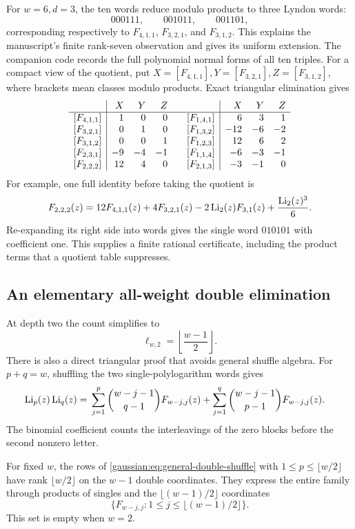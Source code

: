 For \(w=6,d=3\), the ten words reduce modulo products to three Lyndon
words:
\[
000111,\qquad001011,\qquad001101,
\]
corresponding respectively to \(F_{4,1,1}\), \(F_{3,2,1}\),
and \(F_{3,1,2}\). This explains the manuscript's finite rank-seven
observation and gives its uniform extension.
The companion code records the full polynomial normal forms of all ten
triples. For a compact view of the quotient, put
\(X=[F_{4,1,1}],Y=[F_{3,2,1}],Z=[F_{3,1,2}]\), where brackets mean
classes modulo products. Exact triangular elimination gives
\[
\begin{array}{c|rrr@{\qquad}c|rrr}
 &X&Y&Z&&X&Y&Z\\ \hline
{}[F_{4,1,1}]&1&0&0 &[F_{1,4,1}]&6&3&1\\
{}[F_{3,2,1}]&0&1&0 &[F_{1,3,2}]&-12&-6&-2\\
{}[F_{3,1,2}]&0&0&1 &[F_{1,2,3}]&12&6&2\\
{}[F_{2,3,1}]&-9&-4&-1 &[F_{1,1,4}]&-6&-3&-1\\
{}[F_{2,2,2}]&12&4&0 &[F_{2,1,3}]&-3&-1&0
\end{array}
\]
For example, one full identity before taking the quotient is
\begin{equation}
F_{2,2,2}(z)=12F_{4,1,1}(z)+4F_{3,2,1}(z)
-2\operatorname{Li}_2(z)F_{3,1}(z)+\frac{\operatorname{Li}_2(z)^3}{6}.
\label{gaussian:eq:full-222}
\end{equation}
Re-expanding its right side into words gives the single word \(010101\)
with coefficient one. This supplies a finite rational certificate,
including the product terms that a quotient table suppresses.

\subsection{An elementary all-weight double elimination}

At depth two the count simplifies to
\[
\ell_{w,2}=\left\lfloor\frac{w-1}{2}\right\rfloor.
\]
There is also a direct triangular proof that avoids general shuffle
algebra. For \(p+q=w\), shuffling the two single-polylogarithm words gives
\begin{align}
\operatorname{Li}_p(z)\operatorname{Li}_q(z)
={}&\sum_{j=1}^{p}\binom{w-j-1}{q-1}F_{w-j,j}(z)
+\sum_{j=1}^{q}\binom{w-j-1}{p-1}F_{w-j,j}(z).
\label{gaussian:eq:general-double-shuffle}
\end{align}
The binomial coefficient counts the interleavings of the zero blocks
before the second nonzero letter.

\begin{proposition}\label{gaussian:prop:double-rank}
For fixed \(w\), the rows of
\eqref{gaussian:eq:general-double-shuffle} with
\(1\le p\le\lfloor w/2\rfloor\) have rank
\(\lfloor w/2\rfloor\) on the \(w-1\) double coordinates.
They express the entire family through products of singles and the
\(\lfloor(w-1)/2\rfloor\) coordinates
\[
\{F_{w-j,j}:1\le j\le\lfloor(w-1)/2\rfloor\}.
\]
This set is empty when \(w=2\).
\end{proposition}

